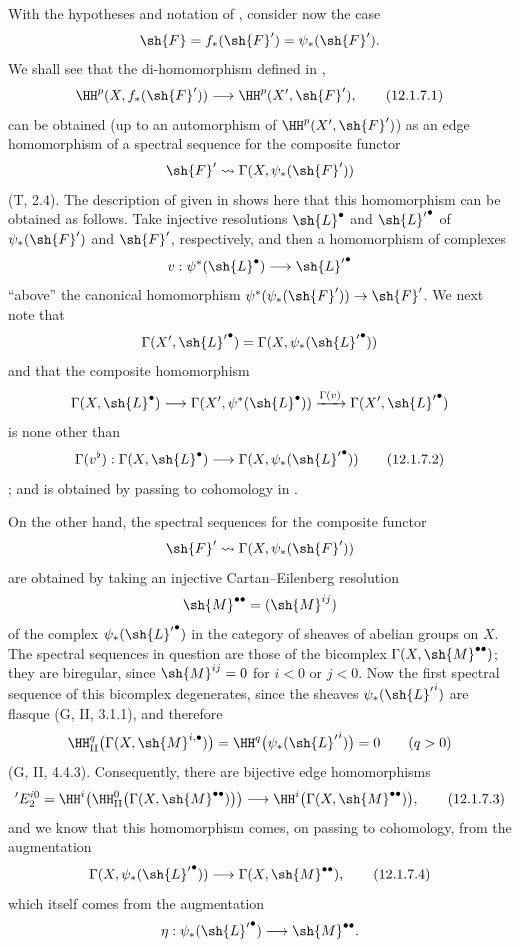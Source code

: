 \begin{env}[12.1.7]
\label{0.12.1.7}
With the hypotheses and notation of , consider now the
case
\[
  \sh{F}=f_*(\sh{F}')=\psi_*(\sh{F}').
\]
We shall see that the di-homomorphism defined in ,
\[
  \HH^p(X,f_*(\sh{F}'))\longrightarrow\HH^p(X',\sh{F}'),
  \tag{12.1.7.1}
  \label{0.12.1.7.1}
\]
can be obtained (up to an automorphism of $\HH^p(X',\sh{F}')$) as an
edge homomorphism of a spectral sequence for the composite functor
\[
  \sh{F}'\leadsto\Gamma(X,\psi_*(\sh{F}'))
\]
(T, 2.4).
The description of  given in  shows
here that this homomorphism can be obtained as follows.
Take injective resolutions $\sh{L}^\bullet$ and
${\sh{L}'}^\bullet$ of $\psi_*(\sh{F}')$ and $\sh{F}'$,
respectively, and then a homomorphism of complexes
\[
  v:\psi^*(\sh{L}^\bullet)\longrightarrow{\sh{L}'}^\bullet
\]
``above'' the canonical homomorphism
$\psi^*(\psi_*(\sh{F}'))\to\sh{F}'$.
We next note that
\[
  \Gamma(X',{\sh{L}'}^\bullet)
  =\Gamma(X,\psi_*({\sh{L}'}^\bullet))
\]
and that the composite homomorphism
\[
  \Gamma(X,\sh{L}^\bullet)
  \longrightarrow\Gamma(X',\psi^*(\sh{L}^\bullet))
  \xrightarrow{\Gamma(v)}\Gamma(X',{\sh{L}'}^\bullet)
\]
is none other than
\[
  \Gamma(v^\flat):
  \Gamma(X,\sh{L}^\bullet)
  \longrightarrow\Gamma(X,\psi_*({\sh{L}'}^\bullet))
  \tag{12.1.7.2}
  \label{0.12.1.7.2}
\]
; and  is
obtained by passing to cohomology in .

On the other hand, the spectral sequences for the composite functor
\[
  \sh{F}'\leadsto\Gamma(X,\psi_*(\sh{F}'))
\]
are obtained by taking an injective Cartan--Eilenberg resolution
\[
  \sh{M}^{\bullet\bullet}=(\sh{M}^{ij})
\]
of the complex $\psi_*({\sh{L}'}^\bullet)$ in the category of
sheaves of abelian groups on $X$.
The spectral sequences in question are those of the bicomplex
$\Gamma(X,\sh{M}^{\bullet\bullet})$; they are biregular, since
$\sh{M}^{ij}=0$ for $i<0$ or $j<0$.
Now the first spectral sequence of this bicomplex degenerates, since
the sheaves $\psi_*({\sh{L}'}^i)$ are flasque (G, II, 3.1.1), and
therefore
\[
  \HH_\mathrm{II}^q
    \bigl(\Gamma(X,\sh{M}^{i,\bullet})\bigr)
  =\HH^q\bigl(\psi_*({\sh{L}'}^i)\bigr)=0
  \qquad(q>0)
\]
(G, II, 4.4.3).
Consequently, there are bijective edge homomorphisms
\[
  {}'E_2^{i0}
  =\HH^i\!\left(
      \HH_\mathrm{II}^0
        \bigl(\Gamma(X,\sh{M}^{\bullet\bullet})\bigr)
    \right)
  \longrightarrow
  \HH^i\bigl(\Gamma(X,\sh{M}^{\bullet\bullet})\bigr),
  \tag{12.1.7.3}
  \label{0.12.1.7.3}
\]
and we know  that this homomorphism comes, on passing
to cohomology, from the augmentation
\[
  \Gamma(X,\psi_*({\sh{L}'}^\bullet))
  \longrightarrow\Gamma(X,\sh{M}^{\bullet\bullet}),
  \tag{12.1.7.4}
  \label{0.12.1.7.4}
\]
which itself comes from the augmentation
\[
  \eta:\psi_*({\sh{L}'}^\bullet)
  \longrightarrow\sh{M}^{\bullet\bullet}.
\]


\end{env}
